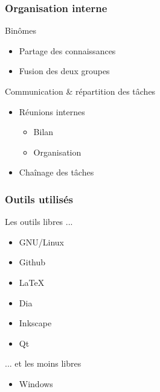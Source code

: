 \begin{frame}
\frametitle{Organisation interne}

\begin{block}{Binômes}
\begin{itemize}
    \item Partage des connaissances
    \item Fusion des deux groupes
\end{itemize}
\end{block}

\begin{block}{Communication \& répartition des tâches}
\begin{itemize}
    \item Réunions internes %
    \begin{itemize}
        \item Bilan %
        \item Organisation %
    \end{itemize}
    \item Chaînage des tâches %
\end{itemize}
\end{block}

\end{frame} %

\begin{frame}
\frametitle{Outils utilisés}

\begin{block}{Les outils libres ...}
\begin{itemize}
    \item GNU/Linux
    \item Github
    \item \LaTeX
    \item Dia
    \item Inkscape
    \item Qt
\end{itemize}
\end{block}

\begin{block}{... et les moins libres}
\begin{itemize}
    \item Windows %
\end{itemize}
\end{block}

\end{frame} %


